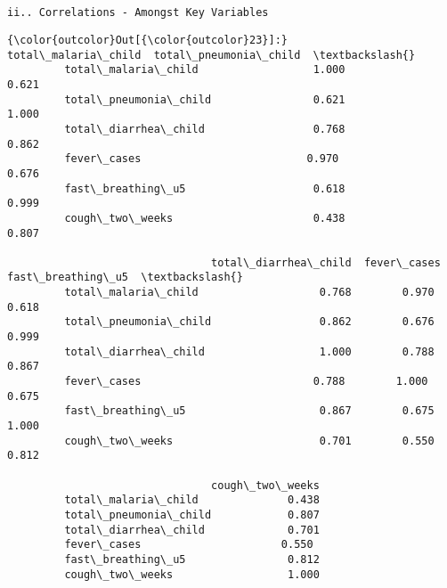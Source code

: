 \documentclass[11pt]{article}
\begin{document}
    \begin{Verbatim}[commandchars=\\\{\}]


ii.. Correlations - Amongst Key Variables

    \end{Verbatim}

\begin{Verbatim}[commandchars=\\\{\}]
{\color{outcolor}Out[{\color{outcolor}23}]:}                        total\_malaria\_child  total\_pneumonia\_child  \textbackslash{}
         total\_malaria\_child                  1.000                  0.621   
         total\_pneumonia\_child                0.621                  1.000   
         total\_diarrhea\_child                 0.768                  0.862   
         fever\_cases                          0.970                  0.676   
         fast\_breathing\_u5                    0.618                  0.999   
         cough\_two\_weeks                      0.438                  0.807   
         
                                total\_diarrhea\_child  fever\_cases  fast\_breathing\_u5  \textbackslash{}
         total\_malaria\_child                   0.768        0.970              0.618   
         total\_pneumonia\_child                 0.862        0.676              0.999   
         total\_diarrhea\_child                  1.000        0.788              0.867   
         fever\_cases                           0.788        1.000              0.675   
         fast\_breathing\_u5                     0.867        0.675              1.000   
         cough\_two\_weeks                       0.701        0.550              0.812   
         
                                cough\_two\_weeks  
         total\_malaria\_child              0.438  
         total\_pneumonia\_child            0.807  
         total\_diarrhea\_child             0.701  
         fever\_cases                      0.550  
         fast\_breathing\_u5                0.812  
         cough\_two\_weeks                  1.000  
\end{Verbatim}
            
    \begin{center}
    \end{center}
    { \hspace*{\fill} \\}
    
\end{document}
